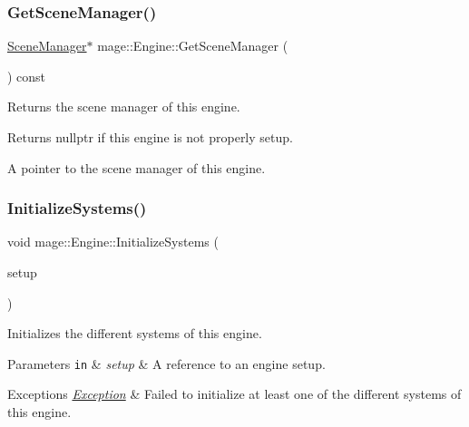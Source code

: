 \subsubsection{\texorpdfstring{Get\+Scene\+Manager()}{GetSceneManager()}}
{\footnotesize\ttfamily \hyperlink{classmage_1_1_scene_manager}{Scene\+Manager}$\ast$ mage\+::\+Engine\+::\+Get\+Scene\+Manager (\begin{DoxyParamCaption}{ }\end{DoxyParamCaption}) const\hspace{0.3cm}{\ttfamily [noexcept]}}

Returns the scene manager of this engine.

\begin{DoxyReturn}{Returns}
{\ttfamily nullptr} if this engine is not properly setup. 

A pointer to the scene manager of this engine. 
\end{DoxyReturn}
\hypertarget{classmage_1_1_engine_a29a47448fb182b110d46d287a72b8b4e}{}\label{classmage_1_1_engine_a29a47448fb182b110d46d287a72b8b4e} 
\subsubsection{\texorpdfstring{Initialize\+Systems()}{InitializeSystems()}}
{\footnotesize\ttfamily void mage\+::\+Engine\+::\+Initialize\+Systems (\begin{DoxyParamCaption}\item[{const \hyperlink{classmage_1_1_engine_setup}{Engine\+Setup} \&}]{setup }\end{DoxyParamCaption})\hspace{0.3cm}{\ttfamily [private]}}

Initializes the different systems of this engine.


\begin{DoxyParams}[1]{Parameters}
\mbox{\tt in}  & {\em setup} & A reference to an engine setup. \\
\hline
\end{DoxyParams}

\begin{DoxyExceptions}{Exceptions}
{\em \hyperlink{classmage_1_1_exception}{Exception}} & Failed to initialize at least one of the different systems of this engine. \\
\hline
\end{DoxyExceptions}
\hypertarget{classmage_1_1_engine_a55281f34ad0fd2c77f1d11c54ec66c19}{}\label{classmage_1_1_engine_a55281f34ad0fd2c77f1d11c54ec66c19} 
